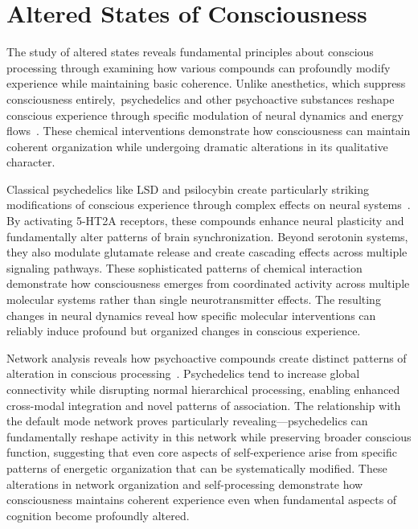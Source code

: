 \section{Altered States of Consciousness}

The study of altered states reveals fundamental principles about conscious processing through examining how various compounds can profoundly modify experience while maintaining basic coherence. Unlike anesthetics, which suppress consciousness entirely,~psychedelics and other psychoactive substances reshape conscious experience through specific modulation of neural dynamics and energy flows~\cite{hunt2024electromagnetic}. These chemical interventions demonstrate how consciousness can maintain coherent organization while undergoing dramatic alterations in its qualitative character.

Classical psychedelics like LSD and psilocybin create particularly striking modifications of conscious experience through complex effects on neural systems~\cite{pinotsis2023cytoelectric, kukushkin2024massed}. By activating 5-HT2A receptors, these compounds enhance neural plasticity and fundamentally alter patterns of brain synchronization. Beyond serotonin systems, they also modulate glutamate release and create cascading effects across multiple signaling pathways. These sophisticated patterns of chemical interaction demonstrate how consciousness emerges from coordinated activity across multiple molecular systems rather than single neurotransmitter effects. The resulting changes in neural dynamics reveal how specific molecular interventions can reliably induce profound but organized changes in conscious experience.

Network analysis reveals how psychoactive compounds create distinct patterns of alteration in conscious processing~\cite{van2025processes, bosl2025dynamical}. Psychedelics tend to increase global connectivity while disrupting normal hierarchical processing, enabling enhanced cross-modal integration and novel patterns of association. The relationship with the default mode network proves particularly revealing—psychedelics can fundamentally reshape activity in this network while preserving broader conscious function, suggesting that even core aspects of self-experience arise from specific patterns of energetic organization that can be systematically modified. These alterations in network organization and self-processing demonstrate how consciousness maintains coherent experience even when fundamental aspects of cognition become profoundly altered.

